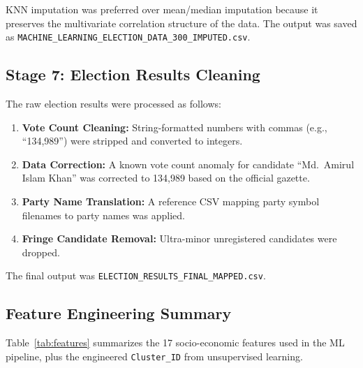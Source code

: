 \documentclass[12pt, a4paper]{article}
\begin{document}
KNN imputation was preferred over mean/median imputation because it preserves the multivariate correlation structure of the data. The output was saved as \texttt{MACHINE\_LEARNING\_ELECTION\_DATA\_300\_IMPUTED.csv}.

\subsection{Stage 7: Election Results Cleaning}
The raw election results were processed as follows:
\begin{enumerate}
    \item \textbf{Vote Count Cleaning:} String-formatted numbers with commas (e.g., ``134,989'') were stripped and converted to integers.
    \item \textbf{Data Correction:} A known vote count anomaly for candidate ``Md.\ Amirul Islam Khan'' was corrected to 134,989 based on the official gazette.
    \item \textbf{Party Name Translation:} A reference CSV mapping party symbol filenames to party names was applied.
    \item \textbf{Fringe Candidate Removal:} Ultra-minor unregistered candidates were dropped.
\end{enumerate}

The final output was \texttt{ELECTION\_RESULTS\_FINAL\_MAPPED.csv}.

\subsection{Feature Engineering Summary}

Table~\ref{tab:features} summarizes the 17 socio-economic features used in the ML pipeline, plus the engineered \texttt{Cluster\_ID} from unsupervised learning.
\end{document}
